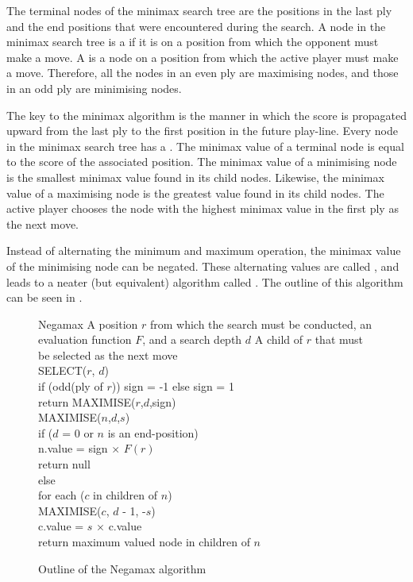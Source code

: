 The terminal nodes of the minimax search tree are the positions in the last ply and the end positions that were encountered during the search. A node in the minimax search tree is a  if it is on a position from which the opponent must make a move.  A  is a node on a position from which the active player must make a move.  Therefore, all the nodes in an even ply are maximising nodes, and those in an odd ply are minimising nodes.    

The key to the minimax algorithm is the manner in which the score is propagated upward from the last ply to the first position in the future play-line. Every node in the minimax search tree has a . The minimax value of a terminal node is equal to the score of the associated position.  The minimax value of a minimising node is the smallest minimax value found in its child nodes.  Likewise, the minimax value of a maximising node is the greatest value found in its child nodes.  The active player chooses the node with the highest minimax value in the first ply as the next move.  


Instead of alternating the minimum and maximum operation, the minimax value of the minimising node can be negated. These alternating values are called , and leads to a neater (but equivalent) algorithm called  \cite{furnkranz:survey}.  The outline of this algorithm can be seen in .

\begin{figure} [ht]
\begin{algorithm} 
{Negamax}
{A position $r$ from which the search must be conducted, an evaluation function $F$, and a search depth $d$}
{A child of $r$ that must be selected as the next move} 
\\
SELECT($r$, $d$)  \+\\
	if (odd(ply of $r$)) sign = -1 else sign = 1 \\
	return MAXIMISE($r$,$d$,sign) \-\\
MAXIMISE($n$,$d$,$s$) \+\\
	if ($d$ = 0 or $n$ is an end-position) \+\\
	  n.value = sign $\times$ $F(r)$ \\
		return null \-\\
	else \+\\		
			for each ($c$ in children of $n$) \+\\
				MAXIMISE($c$, $d$ - 1, -$s$) \\
				c.value = $s$ $\times$ c.value \-\\
			return maximum valued node in children of $n$ \\
\end{algorithm}
\caption{Outline of the Negamax algorithm}	
\label{alg:negamax}
\end{figure}


